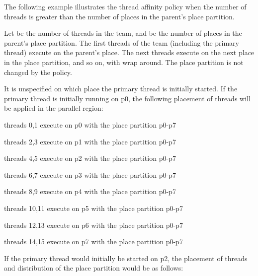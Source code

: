 The following example illustrates the  thread affinity policy when 
the number of threads is greater than the number of places in the parent's place 
partition.

Let  be the number of threads in the team, and  be the number of places in the 
parent's place partition. The first  threads of the team (including the primary
thread) execute on the parent's place. The next  threads execute on the next 
place in the place partition, and so on, with wrap around. The place partition 
is not changed by the  policy.


\clearpage

It is unspecified on which place the primary thread is initially started. If the 
primary thread is initially running on p0, the following placement of threads will 
be applied in the parallel region:

\begin{compactitem}
\item threads 0,1 execute on p0 with the place partition p0-p7

\item threads 2,3 execute on p1 with the place partition p0-p7

\item threads 4,5 execute on p2 with the place partition p0-p7

\item threads 6,7 execute on p3 with the place partition p0-p7

\item threads 8,9 execute on p4 with the place partition p0-p7

\item threads 10,11 execute on p5 with the place partition p0-p7

\item threads 12,13 execute on p6 with the place partition p0-p7

\item threads 14,15 execute on p7 with the place partition p0-p7
\end{compactitem}

If the primary thread would initially be started on p2, the placement of threads 
and distribution of the place partition would be as follows:

